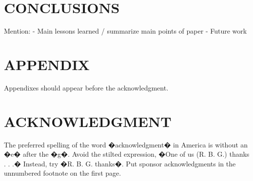 \documentclass[letterpaper, 10 pt, conference]{ieeeconf}  %
\begin{document}
   
\section{CONCLUSIONS}

Mention:
  - Main lessons learned / summarize main points of paper
 - Future work
 
 


\addtolength{\textheight}{-12cm}   %







\section*{APPENDIX}

Appendixes should appear before the acknowledgment.

\section*{ACKNOWLEDGMENT}

The preferred spelling of the word �acknowledgment� in America is without an �e� after the �g�. Avoid the stilted expression, �One of us (R. B. G.) thanks . . .�  Instead, try �R. B. G. thanks�. Put sponsor acknowledgments in the unnumbered footnote on the first page.




\end{document}
